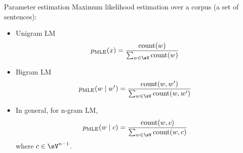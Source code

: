 \documentclass[usenames,dvipsnames,notes,11pt,aspectratio=169,hyperref={colorlinks=true, linkcolor=blue}]{beamer}
\begin{document}

%

\begin{frame}
    {Parameter estimation}
    Maximum likelihood estimation over a corpus (a set of sentences):\\
    \begin{itemize}
        \item Unigram LM
            $$
            {p}_{\text{MLE}}(x) = \frac{\text{count}(w)}{\sum_{w\in\sV}\text{count}(w)}
            $$
        \item Bigram LM
            $$
            {p}_{\text{MLE}}(w\mid w') =
            \frac{\text{count}(w,w')}{\sum_{w\in\sV}\text{count}(w,w')}
            $$
        \item In general, for n-gram LM,
            $$
            {p}_{\text{MLE}}(w\mid c) =
            \frac{\text{count}(w,c)}{\sum_{w\in\sV}\text{count}(w,c)}
            $$
            where $c\in \sV^{n-1}$.
    \end{itemize}
\end{frame}
\end{document}
